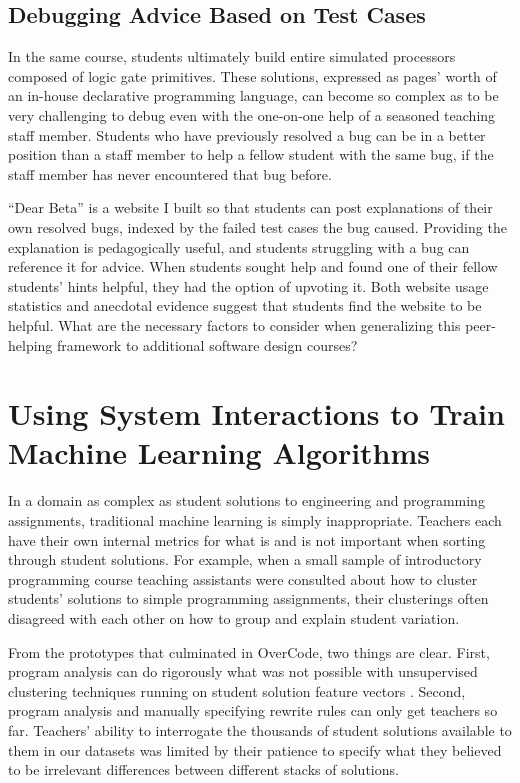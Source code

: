 \documentclass{sigchi}
\begin{document}
\subsection{Debugging Advice Based on Test Cases} In the same course, students ultimately build entire simulated processors composed of logic gate primitives. These solutions, expressed as pages' worth of an in-house declarative programming language, can become so complex as to be very challenging to debug even with the one-on-one help of a seasoned teaching staff member. Students who have previously resolved a bug can be in a better position than a staff member to help a fellow student with the same bug, if the staff member has never encountered that bug before.

``Dear Beta'' is a website I built so that students can post explanations of their own resolved bugs, indexed by the failed test cases the bug caused. Providing the explanation is pedagogically useful, and students struggling with a bug can reference it for advice. When students sought help and found one of their fellow students' hints helpful, they had the option of upvoting it. Both website usage statistics and anecdotal evidence suggest that students find the website to be helpful. What are the necessary factors to consider when generalizing this peer-helping framework to additional software design courses?

\section{Using System Interactions to Train Machine Learning Algorithms}

In a domain as complex as student solutions to engineering and programming assignments, traditional machine learning is simply inappropriate. Teachers each have their own internal metrics for what is and is not important when sorting through student solutions. For example, when a small sample of introductory programming course teaching assistants were consulted about how to cluster students' solutions to simple programming assignments, their clusterings often disagreed with each other on how to group and explain student variation.

From the prototypes that culminated in OverCode, two things are clear. First, program analysis can do rigorously what was not possible with unsupervised clustering techniques running on student solution feature vectors \cite{GlassmanCHIWkshop}. Second, program analysis and manually specifying rewrite rules can only get teachers so far. Teachers' ability to interrogate the thousands of student solutions available to them in our datasets was limited by their patience to specify what they believed to be irrelevant differences between different stacks of solutions.
\end{document}
